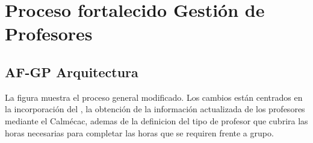 \chapter{Proceso fortalecido Gestión de Profesores}
\label{ch:PF-GP}
\section{AF-GP Arquitectura}
%	
	La figura  muestra el proceso general modificado. Los cambios están centrados en la incorporación del , la obtención de la información actualizada de los profesores mediante el Calmécac, ademas de la definicion del tipo de profesor que cubrira las horas necesarias para completar las horas que se requiren frente a grupo.
